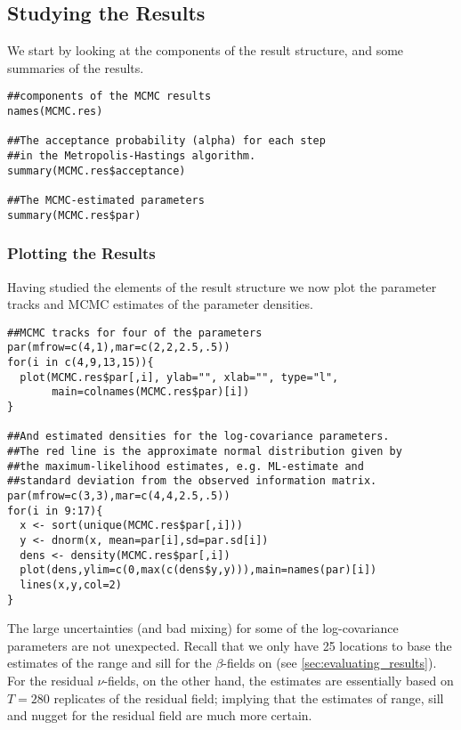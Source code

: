 \subsection{Studying the Results}
We start by looking at the components of the result structure,
and some summaries of the results.
\vspace*{-0.5\baselineskip}
\begin{verbatim}
##components of the MCMC results
names(MCMC.res)

##The acceptance probability (alpha) for each step 
##in the Metropolis-Hastings algorithm.
summary(MCMC.res$acceptance)

##The MCMC-estimated parameters
summary(MCMC.res$par)
\end{verbatim}

\subsubsection{Plotting the Results}
Having studied the elements of the result structure we now plot the 
parameter tracks and MCMC estimates of the parameter densities.
\vspace*{-0.5\baselineskip}
\begin{verbatim}
##MCMC tracks for four of the parameters
par(mfrow=c(4,1),mar=c(2,2,2.5,.5))
for(i in c(4,9,13,15)){
  plot(MCMC.res$par[,i], ylab="", xlab="", type="l",
       main=colnames(MCMC.res$par)[i])
}

##And estimated densities for the log-covariance parameters.
##The red line is the approximate normal distribution given by
##the maximum-likelihood estimates, e.g. ML-estimate and 
##standard deviation from the observed information matrix.
par(mfrow=c(3,3),mar=c(4,4,2.5,.5))
for(i in 9:17){
  x <- sort(unique(MCMC.res$par[,i]))
  y <- dnorm(x, mean=par[i],sd=par.sd[i])
  dens <- density(MCMC.res$par[,i])
  plot(dens,ylim=c(0,max(c(dens$y,y))),main=names(par)[i])
  lines(x,y,col=2)
}
\end{verbatim}
The large uncertainties (and bad mixing) for some of the 
log-covariance parameters are not unexpected. Recall that we only
have 25 locations to base the estimates of the range and sill for
the $\beta$-fields on (see \autoref{sec:evaluating_results}). For 
the residual $\nu$-fields, on the other hand, the estimates are
essentially based on $T=280$ replicates of the residual field;
implying that the estimates of range, sill and nugget for the 
residual field are much more certain.
